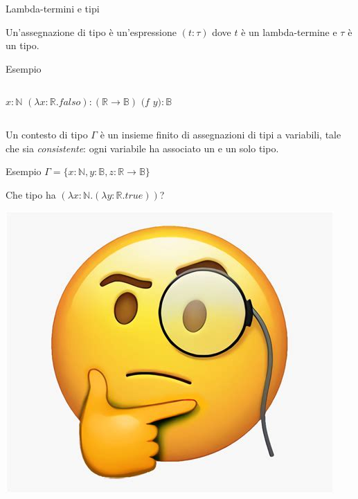 \documentclass{beamer}
\begin{document}
\begin{frame}{Lambda-termini e tipi}
  \begin{definition}
    Un'assegnazione di tipo è un'espressione $(t : \tau)$ dove $t$ è un lambda-termine
    e $\tau$ è un tipo.
  \end{definition}
  \begin{exampleblock}{Esempio}
    \begin{columns}
      $x : \mathbb{N}$
      $(\lambda x: \mathbb{R}. falso): (\mathbb{R} \rightarrow \mathbb{B})$
      $(f$ $y) : \mathbb{B}$
    \end{columns}
  \end{exampleblock}

  \begin{definition}
    Un contesto di tipo $\Gamma$ è un insieme finito di assegnazioni di tipi a
    variabili, tale che sia \textit{consistente}: ogni variabile ha associato un
    e un solo tipo.
  \end{definition}
  \begin{exampleblock}{Esempio}
    $\Gamma =\{x: \mathbb{N}, y: \mathbb{B}, z: \mathbb{R} \rightarrow \mathbb{B}\}$
  \end{exampleblock}
\end{frame}

\begin{frame}{Che tipo ha $(\lambda x: \mathbb{N}. (\lambda y: \mathbb{R}. true))$?}
\begin{center}
\includegraphics[scale=0.40]{5.jpg}
\end{center}
\end{frame}
\end{document}
